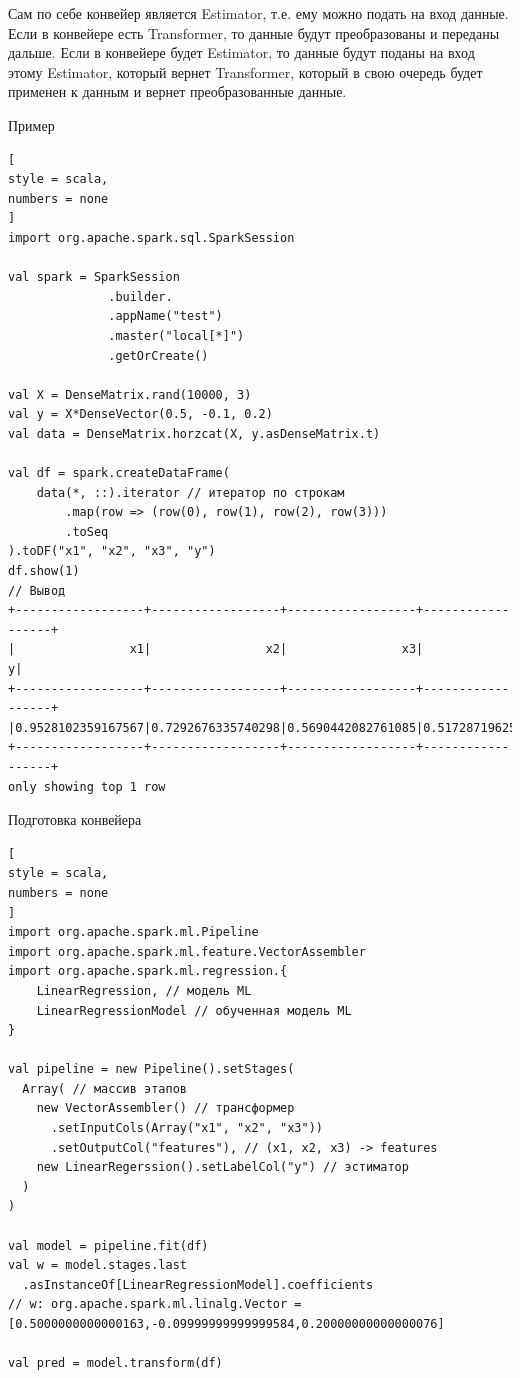 \documentclass[%
	11pt,
	a4paper,
	utf8,
		]{article}
\begin{document}
Сам по себе конвейер является Estimator, т.е. ему можно подать на вход данные. Если в конвейере есть Transformer, то данные будут преобразованы и переданы дальше. Если в конвейере будет Estimator, то данные будут поданы на вход этому Estimator, который вернет Transformer, который в свою очередь будет применен к данным и вернет преобразованные данные.

Пример
\begin{lstlisting}[
style = scala,
numbers = none	
]
import org.apache.spark.sql.SparkSession

val spark = SparkSession
              .builder.
              .appName("test")
              .master("local[*]")
              .getOrCreate()
              
val X = DenseMatrix.rand(10000, 3)
val y = X*DenseVector(0.5, -0.1, 0.2)
val data = DenseMatrix.horzcat(X, y.asDenseMatrix.t)
              
val df = spark.createDataFrame(
    data(*, ::).iterator // итератор по строкам
        .map(row => (row(0), row(1), row(2), row(3)))
        .toSeq
).toDF("x1", "x2", "x3", "y")
df.show(1)
// Вывод
+------------------+------------------+------------------+------------------+
|                x1|                x2|                x3|                 y|
+------------------+------------------+------------------+------------------+
|0.9528102359167567|0.7292676335740298|0.5690442082761085|0.5172871962561971|
+------------------+------------------+------------------+------------------+
only showing top 1 row
\end{lstlisting}

Подготовка конвейера
\begin{lstlisting}[
style = scala,
numbers = none	
]
import org.apache.spark.ml.Pipeline
import org.apache.spark.ml.feature.VectorAssembler
import org.apache.spark.ml.regression.{
	LinearRegression, // модель ML
	LinearRegressionModel // обученная модель ML
}

val pipeline = new Pipeline().setStages(
  Array( // массив этапов
    new VectorAssembler() // трансформер
      .setInputCols(Array("x1", "x2", "x3"))
      .setOutputCol("features"), // (x1, x2, x3) -> features
    new LinearRegerssion().setLabelCol("y") // эстиматор
  )
)

val model = pipeline.fit(df)
val w = model.stages.last
  .asInstanceOf[LinearRegressionModel].coefficients
// w: org.apache.spark.ml.linalg.Vector = [0.5000000000000163,-0.09999999999999584,0.20000000000000076]

val pred = model.transform(df)
\end{lstlisting}
\end{document}
